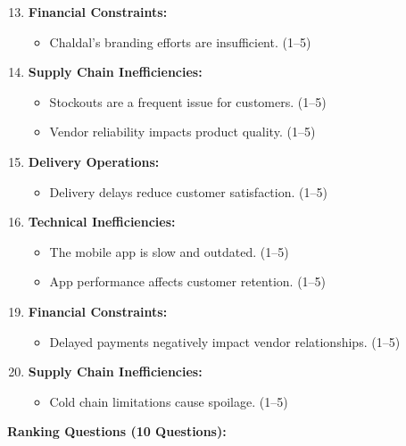 \documentclass[12pt,a4paper]{article}
\begin{document}
\begin{enumerate}
    \setcounter{enumi}{12}
    \item \textbf{Financial Constraints:}
    \begin{itemize}
        \item Chaldal’s branding efforts are insufficient. (1–5)
    \end{itemize}
    \item \textbf{Supply Chain Inefficiencies:}
    \begin{itemize}
        \item Stockouts are a frequent issue for customers. (1–5)
        \item Vendor reliability impacts product quality. (1–5)
    \end{itemize}
    \item \textbf{Delivery Operations:}
    \begin{itemize}
        \item Delivery delays reduce customer satisfaction. (1–5)
    \end{itemize}
    \item \textbf{Technical Inefficiencies:}
    \begin{itemize}
        \item The mobile app is slow and outdated. (1–5)
        \item App performance affects customer retention. (1–5)
    \end{itemize}
\end{enumerate}

\begin{enumerate}
    \setcounter{enumi}{18}
    \item \textbf{Financial Constraints:}
    \begin{itemize}
        \item Delayed payments negatively impact vendor relationships. (1–5)
    \end{itemize}
    \item \textbf{Supply Chain Inefficiencies:}
    \begin{itemize}
        \item Cold chain limitations cause spoilage. (1–5)
    \end{itemize}
\end{enumerate}

\textbf{Ranking Questions (10 Questions):}
\end{document}

